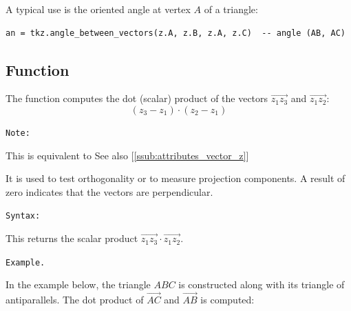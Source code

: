 \noindent A typical use is the oriented angle at vertex $A$ of a triangle:
\begin{verbatim}
an = tkz.angle_between_vectors(z.A, z.B, z.A, z.C)  -- angle (AB, AC)
\end{verbatim}



\subsection{Function }
\label{sub:dot_or_scalar_product}

The function  computes the dot (scalar) product of the vectors $\overrightarrow{z_1z_3}$ and $\overrightarrow{z_1z_2}$:
\[
(z_3 - z_1) \cdot (z_2 - z_1)
\]

\texttt{Note: }

 This is equivalent to  See also [\ref{ssub:attributes_vector_z}]
\label{par:note_dot}


It is used to test orthogonality or to measure projection components. A result of zero indicates that the vectors are perpendicular.

\medskip
\texttt{Syntax: }

\begin{center}
\end{center}
%
This returns the scalar product $\overrightarrow{z_1z_3} \cdot \overrightarrow{z_1z_2}$.

\texttt{Example.}

In the example below, the triangle $ABC$ is constructed along with its triangle of antiparallels. The dot product of $\overrightarrow{AC}$ and $\overrightarrow{AB}$ is computed:

